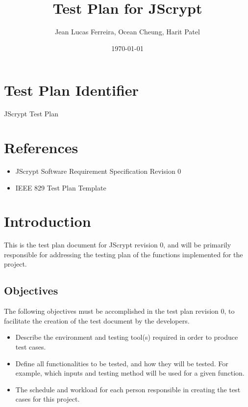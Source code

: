 \documentclass[12pt]{article}
\begin{document}
\title{Test Plan  for JScrypt} 
\author{Jean Lucas Ferreira, Ocean Cheung, Harit Patel}

\date{\today}
	
\maketitle


\newpage
  \tableofcontents

\newpage
 
\section{Test Plan Identifier}
JScrypt Test Plan 


\section{References}

	\begin{itemize}
	  \item JScrypt Software Requirement Specification Revision 0
	  \item IEEE 829 Test Plan Template
	\end{itemize}



\section{Introduction}
This is the test plan document for JScrypt revision 0, and will be primarily responsible for addressing the testing plan of the functions implemented for the project. 

\subsection{Objectives}
The following  objectives must be accomplished in the test plan revision 0, to facilitate the creation of the test document by the developers.
	\begin{itemize}
	  \item Describe the environment and testing tool(s) required in order to produce test cases.
	  \item Define all functionalities to be tested, and how they will be tested. For example, which inputs and testing method will be used for a given function.
	  \item The schedule and workload for each person responsible in creating the test cases for this project.
	\end{itemize}
\end{document}
